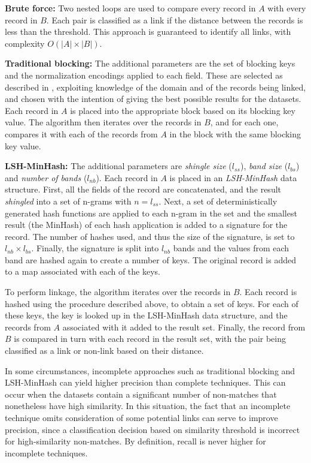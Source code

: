 \documentclass{llncs}
\begin{document}
\textbf{Brute force:}
Two nested loops are used to compare every record in $A$ with every
record in $B$. Each pair is classified as a link if the distance between
the records is less than the threshold. This approach is guaranteed to
identify all links, with complexity $ O(|A| \times |B|) $.

\textbf{Traditional blocking:}
The additional parameters are the set of blocking keys and the
normalization encodings applied to each field. These are selected as
described in \cite{Chr12b}, exploiting knowledge of the domain and of
the records being linked, and chosen with the intention of giving the
best possible results for the datasets. Each record in $A$ is placed
into the appropriate block based on its blocking key value. The
algorithm then iterates over the records in $B$, and for each one,
compares it with each of the records from $A$ in the block with the same
blocking key value.

\textbf{LSH-MinHash:}
The additional parameters are \emph{shingle size} ($l_{ss}$), \emph{band
size} ($l_{bs}$) and \emph{number of bands} ($l_{nb}$). Each record in
$A$ is placed in an \emph{LSH-MinHash} data structure. First, all the
fields of the record are concatenated, and the result \emph{shingled}
into a set of n-grams with $n = l_{ss}$. Next, a set of
deterministically generated hash functions are applied to each n-gram in
the set and the smallest result (the MinHash) of each hash application
is added to a signature for the record. The number of hashes used, and
thus the size of the signature, is set to $l_{nb} \times l_{bs}$.
Finally, the signature is split into $l_{nb}$ bands and the values from
each band are hashed again to create a number of keys. The original
record is added to a map associated with each of the keys. 

To perform linkage, the algorithm iterates over the records in $B$. Each
record is hashed using the procedure described above, to obtain a set of
keys. For each of these keys, the key is looked up in the LSH-MinHash
data structure, and the records from $A$ associated with it added to the
result set. Finally, the record from $B$ is compared in turn with each
record in the result set, with the pair being classified as a link or
non-link based on their distance.

In some circumstances, incomplete approaches such as traditional
blocking and LSH-MinHash can yield higher precision than complete
techniques. This can occur when the datasets contain a significant
number of non-matches that nonetheless have high similarity. In this
situation, the fact that an incomplete technique omits consideration of
some potential links can serve to improve precision, since a
classification decision based on similarity threshold is incorrect for
high-similarity non-matches. By definition, recall is never higher for
incomplete techniques.
\end{document}
